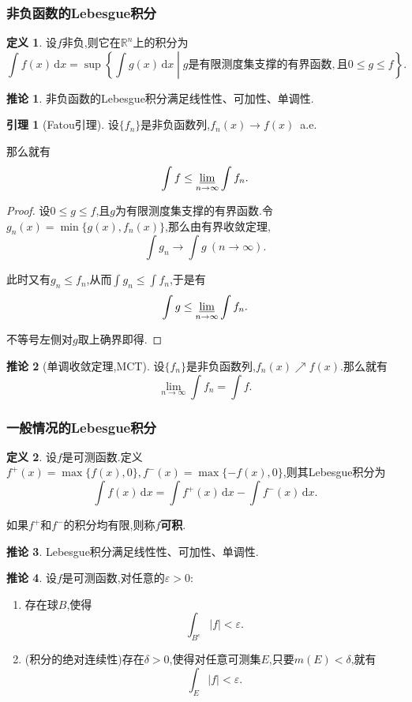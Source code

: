 \documentclass{ctexart}
\theoremstyle{definition}
\newtheorem{definition}{定义}
\newtheorem{lemma}{引理}
\newtheorem{corollary}{推论}
\theoremstyle{remark}
\begin{document}
	\subsubsection{非负函数的Lebesgue积分}
	\begin{definition}
		设$f$非负,则它在$\mathbb{R}^n$上的积分为
		$$\int{f(x)\,\mathrm{d}x}=\sup\left\{\int{g(x)\,\mathrm{d}x} \middle| g\mbox{是有限测度集支撑的有界函数},\mbox{且}0\le g\le f\right\}.$$
	\end{definition}
	\begin{corollary}
		非负函数的Lebesgue积分满足线性性、可加性、单调性.
	\end{corollary}
	
	\begin{lemma}[Fatou引理]
		设$\{f_n\}$是非负函数列,$f_n(x)\to f(x)$\ a.e.
		
		那么就有
		$$\int{f}\le\varliminf_{n\to\infty}{\int{f_n}}.$$
	\end{lemma}
	\begin{proof}
		设$0\le g\le f$,且$g$为有限测度集支撑的有界函数.令$g_n(x)=\min\{g(x),f_n(x)\}$,那么由有界收敛定理,
		$$\int{g_n}\to\int{g}\ (n\to\infty).$$
		
		此时又有$g_n\le f_n$,从而$\int{g_n}\le\int{f_n}$,于是有
		$$\int{g}\le\varliminf_{n\to\infty}{\int{f_n}}.$$
		
		不等号左侧对$g$取上确界即得.
	\end{proof}
	\begin{corollary}[单调收敛定理,MCT]
		设$\{f_n\}$是非负函数列,$f_n(x)\nearrow f(x)$.那么就有
		$$\lim_{n\to\infty}{\int{f_n}}=\int{f}.$$
	\end{corollary}
	
	\subsubsection{一般情况的Lebesgue积分}
	\begin{definition}
		设$f$是可测函数.定义$f^+(x)=\max\{f(x),0\},f^-(x)=\max\{-f(x),0\}$,则其Lebesgue积分为
		$$\int{f(x)\,\mathrm{d}x}=\int{f^+(x)\,\mathrm{d}x}-\int{f^-(x)\,\mathrm{d}x}.$$
		
		如果$f^+$和$f^-$的积分均有限,则称$f$\textbf{可积}.
	\end{definition}
	\begin{corollary}
		Lebesgue积分满足线性性、可加性、单调性.
	\end{corollary}
	\begin{corollary}\label{thm_integral_property}
		设$f$是可测函数,对任意的$\varepsilon>0$:
		\begin{enumerate}
			\item 存在球$B$,使得$$\int_{B^c}{|f|}<\varepsilon.$$
			\item (积分的绝对连续性)存在$\delta>0$,使得对任意可测集$E$,只要$m(E)<\delta$,就有$$\int_E{|f|}<\varepsilon.$$
		\end{enumerate}
	\end{corollary}
	
\end{document}
